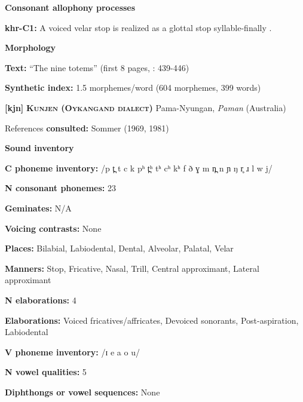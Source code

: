 \textbf{Consonant allophony processes}



\textbf{khr-C1:} A voiced velar stop is realized as a glottal stop syllable-finally \citep[29]{Peterson2011}.



\textbf{Morphology}



\textbf{Text:} “The nine totems” (first 8 pages, \citealt{Peterson2011}: 439-446)



\textbf{Synthetic index:} 1.5 morphemes/word (604 morphemes, 399 words)



\textbf{[kjn]}   \textbf{\textsc{Kunjen (Oykangand dialect)}}  Pama-Nyungan, \textit{Paman} (Australia)



References \textbf{consulted:} Sommer (1969, 1981)



\textbf{Sound inventory}



\textbf{C phoneme inventory:} /p t̪ t c k pʰ t̪ʰ tʰ cʰ kʰ f ð ɣ m n̪ n ɲ ŋ r̥ ɹ l w j/



\textbf{N consonant phonemes:} 23



\textbf{Geminates:} N/A



\textbf{Voicing contrasts:} None



\textbf{Places:} Bilabial, Labiodental, Dental, Alveolar, Palatal, Velar



\textbf{Manners:} Stop, Fricative, Nasal, Trill, Central approximant, Lateral approximant



\textbf{N elaborations:} 4



\textbf{Elaborations:} Voiced fricatives/affricates, Devoiced sonorants, Post-aspiration, Labiodental



\textbf{V phoneme inventory:} /ɪ e a o u/



\textbf{N vowel qualities:} 5



\textbf{Diphthongs or vowel sequences:} None



